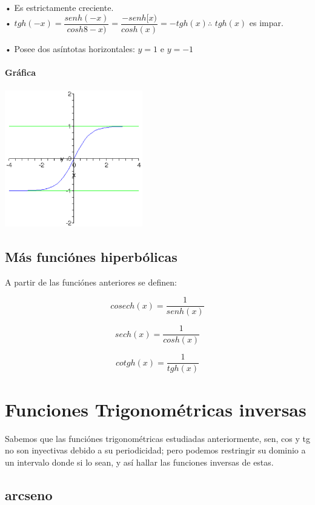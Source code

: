 • Es estrictamente creciente.\\

• $tgh(-x) =\dfrac{senh(-x)}{cosh8-x)}= \dfrac{-senh[x)}{cosh(x)} = -tgh(x) $\qquad $\therefore$ $tgh(x)$ es impar.

• Posee dos asíntotas horizontales: $y=1$ e $y=-1$

\paragraph{Gráfica}
\begin{center}
\includegraphics[height=6cm,width=6cm]{tgh.eps}
\end{center}

\subsection{Más funciónes hiperbólicas}

A partir de las funciónes anteriores se definen:

$$cosech(x)= \dfrac{1}{senh(x)}$$

$$sech(x)=\dfrac{1}{cosh(x)}$$

$$cotgh(x)=\dfrac{1}{tgh(x)}$$

\section{Funciones Trigonométricas inversas}

Sabemos que las funciónes trigonométricas estudiadas anteriormente, sen, cos y tg no son inyectivas debido a su periodicidad; pero podemos restringir su dominio a un intervalo donde si lo sean, y así hallar las funciones inversas de estas.

\subsection{arcseno}

